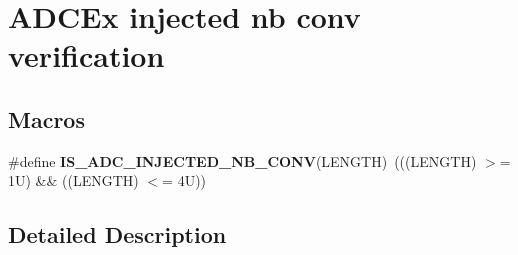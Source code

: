 \hypertarget{group___a_d_c_ex__injected__nb__conv__verification}{}\section{A\+D\+C\+Ex injected nb conv verification}
\label{group___a_d_c_ex__injected__nb__conv__verification}
\subsection*{Macros}
\begin{DoxyCompactItemize}
\item 
\mbox{\label{group___a_d_c_ex__injected__nb__conv__verification_ga4fa3b4cff7cfd5045f5430b80ca58edc}} 
\#define {\bfseries I\+S\+\_\+\+A\+D\+C\+\_\+\+I\+N\+J\+E\+C\+T\+E\+D\+\_\+\+N\+B\+\_\+\+C\+O\+NV}(L\+E\+N\+G\+TH)~(((L\+E\+N\+G\+TH) $>$= 1\+U) \&\& ((\+L\+E\+N\+G\+T\+H) $<$= 4\+U))
\end{DoxyCompactItemize}


\subsection{Detailed Description}
